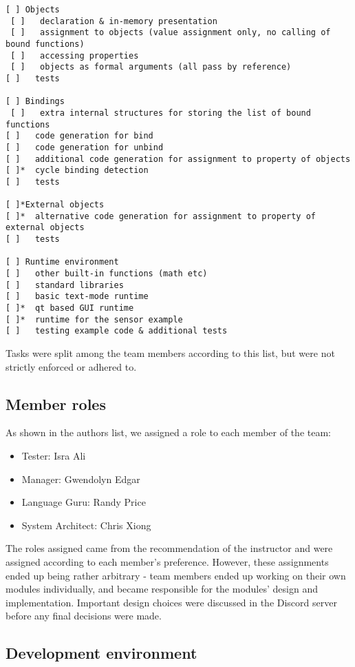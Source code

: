 \begin{verbatim}
[ ] Objects
 [ ]   declaration & in-memory presentation
 [ ]   assignment to objects (value assignment only, no calling of bound functions)
 [ ]   accessing properties
 [ ]   objects as formal arguments (all pass by reference)
[ ]   tests

[ ] Bindings
 [ ]   extra internal structures for storing the list of bound functions
[ ]   code generation for bind
[ ]   code generation for unbind
[ ]   additional code generation for assignment to property of objects
[ ]*  cycle binding detection
[ ]   tests

[ ]*External objects
[ ]*  alternative code generation for assignment to property of external objects
[ ]   tests

[ ] Runtime environment
[ ]   other built-in functions (math etc)
[ ]   standard libraries
[ ]   basic text-mode runtime
[ ]*  qt based GUI runtime
[ ]*  runtime for the sensor example
[ ]   testing example code & additional tests
\end{verbatim}

Tasks were split among the team members according to this list, but were not
strictly enforced or adhered to.

\subsection{Member roles}

As shown in the authors list, we assigned a role to each member of the team:

\begin{itemize}
\item Tester: Isra Ali
\item Manager: Gwendolyn Edgar
\item Language Guru: Randy Price
\item System Architect: Chris Xiong
\end{itemize}

The roles assigned came from the recommendation of the instructor and were assigned
according to each member's preference. However, these assignments ended up being
rather arbitrary - team members ended up working on their own modules individually,
and became responsible for the modules' design and implementation. Important design
choices were discussed in the Discord server before any final decisions were made.

\subsection{Development environment}

